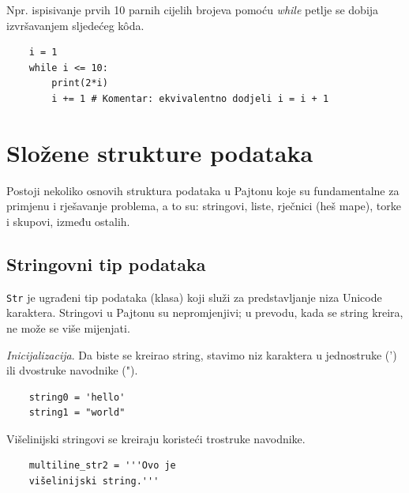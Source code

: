 Npr. ispisivanje prvih 10 parnih cijelih brojeva pomoću \textit{while} petlje se dobija izvršavanjem sljedećeg k\^oda.

\begin{verbatim}
	i = 1
	while i <= 10:
	    print(2*i)
	    i += 1 # Komentar: ekvivalentno dodjeli i = i + 1
\end{verbatim}

\section{Složene strukture podataka}

Postoji nekoliko osnovih struktura podataka  u Pajtonu koje su fundamentalne za primjenu i rješavanje problema, a to su: stringovi, liste, rječnici (heš mape), torke i skupovi, između ostalih.  %

\subsection{Stringovni tip podataka}

\texttt{Str} je ugrađeni tip podataka (klasa) koji služi za predstavljanje niza Unicode karaktera. Stringovi u Pajtonu su nepromjenjivi; u prevodu, kada se string kreira, ne može se više mijenjati.

\textit{Inicijalizacija}. Da biste se kreirao string, stavimo niz karaktera u jednostruke (') ili dvostruke navodnike (").

\begin{verbatim}
	string0 = 'hello'
	string1 = "world"
\end{verbatim}

Višelinijski stringovi se kreiraju koristeći trostruke navodnike. 

\begin{verbatim}
	multiline_str2 = '''Ovo je
	višelinijski string.'''
\end{verbatim}

